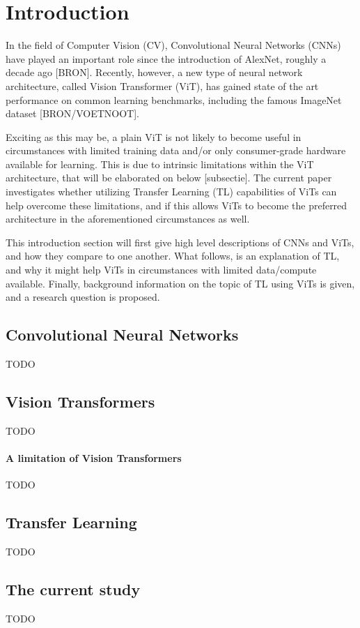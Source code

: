 \section{Introduction}
In the field of Computer Vision (CV), Convolutional Neural Networks (CNNs) have played an important role since the introduction of AlexNet, roughly a decade ago [BRON]. Recently, however, a new type of neural network architecture, called Vision Transformer (ViT), has gained state of the art performance on common learning benchmarks, including the famous ImageNet dataset [BRON/VOETNOOT].

Exciting as this may be, a plain ViT is not likely to become useful in circumstances with limited training data and/or only consumer-grade hardware available for learning. This is due to intrinsic limitations within the ViT architecture, that will be elaborated on below [subsectie]. The current paper investigates whether utilizing Transfer Learning (TL) capabilities of ViTs can help overcome these limitations, and if this allows ViTs to become the preferred architecture in the aforementioned circumstances as well.

This introduction section will first give high level descriptions of CNNs and ViTs, and how they compare to one another. What follows, is an explanation of TL, and why it might help ViTs in circumstances with limited data/compute available. Finally, background information on the topic of TL using ViTs is given, and a research question is proposed.

\subsection{Convolutional Neural Networks}
TODO

\subsection{Vision Transformers}
TODO

\paragraph{A limitation of Vision Transformers}
TODO


\subsection{Transfer Learning}
TODO

\subsection{The current study}
TODO
